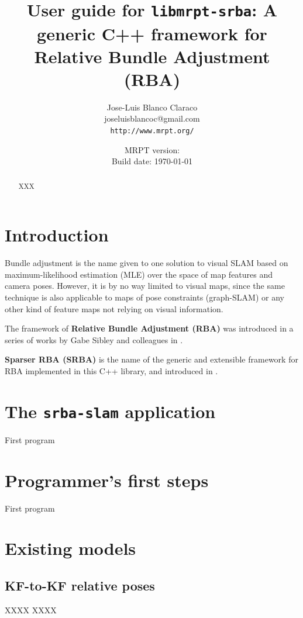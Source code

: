 \documentclass[a4paper,11pt]{article}
\title{User guide for \texttt{libmrpt-srba}: A generic C++ framework for Relative Bundle Adjustment (RBA)}
\author{Jose-Luis Blanco Claraco \\ joseluisblancoc@gmail.com \\ \texttt{http://www.mrpt.org/} }
\date{MRPT version: \MRPTVERSION \\ Build date: \today }
\begin{document}
\maketitle

\begin{abstract}
 XXX
\end{abstract}

\newpage
\tableofcontents
\newpage

\section{Introduction}

Bundle adjustment is the name given to one solution to visual SLAM based on maximum-likelihood estimation (MLE) 
over the space of map features and camera poses. However, it is by no way limited to visual maps, since the same 
technique is also applicable to maps of pose constraints (graph-SLAM) or any other kind of feature maps not relying 
on visual information.

The framework of \textbf{Relative Bundle Adjustment (RBA)} was introduced in a series of works by Gabe Sibley and 
colleagues in \cite{sibley2009rba,sibley2009adaptive}. 

\textbf{Sparser RBA (SRBA)} is the name of the generic and extensible framework for RBA implemented in 
this C++ library, and introduced in \cite{blanco2013srba}.

\section{The \texttt{srba-slam} application}

First program


\section{Programmer's first steps}

First program

\section{Existing models}

\subsection{KF-to-KF relative poses}

XXXX XXXX 
\end{document}
